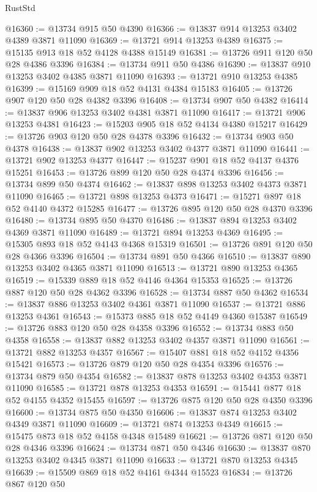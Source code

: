 \begin{lexlean}{RustStd}
\begin{coremodule}
@16360 := @13734 @915 @50 @4390
@16366 := @13837 @914 @13253 @3402 @4389 @3871 @11090
@16369 := @13721 @914 @13253 @4389
@16375 := @15135 @913 @18 @52 @4128 @4388 @15149
@16381 := @13726 @911 @120 @50 @28 @4386 @3396
@16384 := @13734 @911 @50 @4386
@16390 := @13837 @910 @13253 @3402 @4385 @3871 @11090
@16393 := @13721 @910 @13253 @4385
@16399 := @15169 @909 @18 @52 @4131 @4384 @15183
@16405 := @13726 @907 @120 @50 @28 @4382 @3396
@16408 := @13734 @907 @50 @4382
@16414 := @13837 @906 @13253 @3402 @4381 @3871 @11090
@16417 := @13721 @906 @13253 @4381
@16423 := @15203 @905 @18 @52 @4134 @4380 @15217
@16429 := @13726 @903 @120 @50 @28 @4378 @3396
@16432 := @13734 @903 @50 @4378
@16438 := @13837 @902 @13253 @3402 @4377 @3871 @11090
@16441 := @13721 @902 @13253 @4377
@16447 := @15237 @901 @18 @52 @4137 @4376 @15251
@16453 := @13726 @899 @120 @50 @28 @4374 @3396
@16456 := @13734 @899 @50 @4374
@16462 := @13837 @898 @13253 @3402 @4373 @3871 @11090
@16465 := @13721 @898 @13253 @4373
@16471 := @15271 @897 @18 @52 @4140 @4372 @15285
@16477 := @13726 @895 @120 @50 @28 @4370 @3396
@16480 := @13734 @895 @50 @4370
@16486 := @13837 @894 @13253 @3402 @4369 @3871 @11090
@16489 := @13721 @894 @13253 @4369
@16495 := @15305 @893 @18 @52 @4143 @4368 @15319
@16501 := @13726 @891 @120 @50 @28 @4366 @3396
@16504 := @13734 @891 @50 @4366
@16510 := @13837 @890 @13253 @3402 @4365 @3871 @11090
@16513 := @13721 @890 @13253 @4365
@16519 := @15339 @889 @18 @52 @4146 @4364 @15353
@16525 := @13726 @887 @120 @50 @28 @4362 @3396
@16528 := @13734 @887 @50 @4362
@16534 := @13837 @886 @13253 @3402 @4361 @3871 @11090
@16537 := @13721 @886 @13253 @4361
@16543 := @15373 @885 @18 @52 @4149 @4360 @15387
@16549 := @13726 @883 @120 @50 @28 @4358 @3396
@16552 := @13734 @883 @50 @4358
@16558 := @13837 @882 @13253 @3402 @4357 @3871 @11090
@16561 := @13721 @882 @13253 @4357
@16567 := @15407 @881 @18 @52 @4152 @4356 @15421
@16573 := @13726 @879 @120 @50 @28 @4354 @3396
@16576 := @13734 @879 @50 @4354
@16582 := @13837 @878 @13253 @3402 @4353 @3871 @11090
@16585 := @13721 @878 @13253 @4353
@16591 := @15441 @877 @18 @52 @4155 @4352 @15455
@16597 := @13726 @875 @120 @50 @28 @4350 @3396
@16600 := @13734 @875 @50 @4350
@16606 := @13837 @874 @13253 @3402 @4349 @3871 @11090
@16609 := @13721 @874 @13253 @4349
@16615 := @15475 @873 @18 @52 @4158 @4348 @15489
@16621 := @13726 @871 @120 @50 @28 @4346 @3396
@16624 := @13734 @871 @50 @4346
@16630 := @13837 @870 @13253 @3402 @4345 @3871 @11090
@16633 := @13721 @870 @13253 @4345
@16639 := @15509 @869 @18 @52 @4161 @4344 @15523
@16834 := @13726
    @867
    @120
    @50

\end{coremodule}
\end{lexlean}
